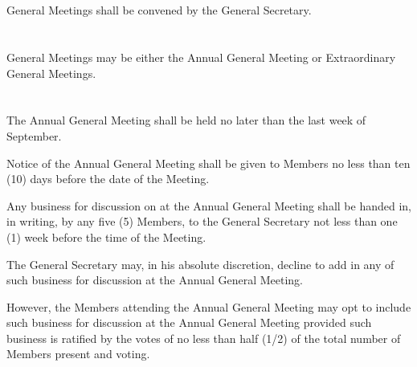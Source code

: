 
\section{}
General Meetings shall be convened by the General Secretary.

\section{}
General Meetings may be either the Annual General Meeting or Extraordinary General Meetings.

\section{}
The Annual General Meeting shall be held no later than the last week of September.
	\begin{legal}
	\item Notice of the Annual General Meeting shall be given to Members no less than ten (10) days before the date of the Meeting.
	\item Any business for discussion on at the Annual General Meeting shall be handed in, in writing, by any five (5) Members, to the General Secretary not less than one (1) week before the time of the Meeting.
		\begin{legal}
		\item The General Secretary may, in his absolute discretion, decline to add in any of such business for discussion at the Annual General Meeting.
		\item However, the Members attending the Annual General Meeting may opt to include such business for discussion at the Annual General Meeting provided such business is ratified by the votes of no less than half (1/2) of the total number of Members present and voting.
		\end{legal}
	\end{legal}

